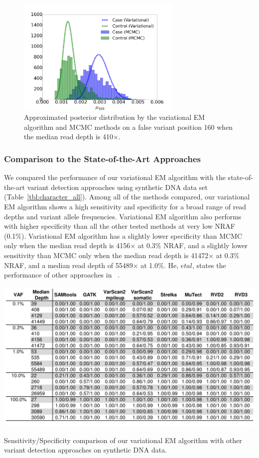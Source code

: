 \documentclass[11pt,reqno]{amsart}
\begin{document}
\begin{figure}[htbp]
\centering
\includegraphics[width=0.7\textwidth]{figs/position_160_410_mcmc_vs_var_mu_fig2.png}
\caption{Approximated posterior distribution by the variational EM algorithm and MCMC methods on a false variant position 160 when the median read depth is 410$\times$.}
\label{tbl:compare2}
\end{figure}
\subsubsection{Comparison to the State-of-the-Art Approaches}
We compared the performance of our variational EM algorithm with the state-of-the-art variant detection approaches using synthetic DNA data set (Table~\ref{tbl:character_all}).
Among all of the methods compared, our variational EM algorithm shows a high sensitivity and specificity for a broad range of read depths and variant allele frequencies.
Variational EM algorithm also performs with higher specificity than all the other tested methods at very low NRAF (0.1\%).
Variational EM algorithm has a slightly lower specificity than MCMC only when the median read depth is 4156$\times$ at 0.3\% NRAF, and a slightly lower sensitivity than MCMC only when the median read depth is 41472$\times$ at 0.3\% NRAF, and a median read depth of 55489$\times$ at 1.0\%.
He, $\mathit{et} \mathit{al}$, states the performance of other approaches in ~\citep{he2015rvd2}.
\begin{table}[htbp]
\centering
\includegraphics[width=1.0\textwidth]{tables/character_all.png}
\caption{Sensitivity/Specificity comparison of our variational EM algorithm with other variant detection approaches on synthetic DNA data.}
\vspace{-5pt}
\label{tbl:character_all}
\end{table}
\end{document}
